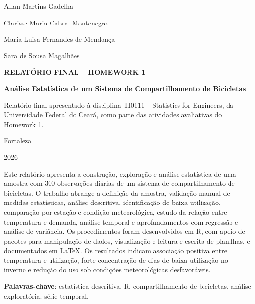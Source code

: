 \documentclass[12pt,oneside,a4paper,english,brazil]{abntex2}
\begin{document}
\begin{folhaderosto}
\begin{center}
{\large Allan Martins Gadelha\par}
{\large Clarisse Maria Cabral Montenegro\par}
{\large Maria Luisa Fernandes de Mendonça\par}
{\large Sara de Sousa Magalhães\par}

\vfill
{\Large\bfseries RELATÓRIO FINAL -- HOMEWORK 1\par}
\vspace{0.35cm}
{\large\bfseries Análise Estatística de um Sistema de Compartilhamento de Bicicletas\par}

\vfill
\hspace{0.45\textwidth}
\begin{minipage}{0.50\textwidth}
\SingleSpacing
Relatório final apresentado à disciplina TI0111 -- Statistics for Engineers, da Universidade Federal do Ceará, como parte das atividades avaliativas do Homework 1.
\end{minipage}

\vfill
{\large Fortaleza\par}
{\large 2026\par}
\end{center}
\end{folhaderosto}

\begin{resumo}
Este relatório apresenta a construção, exploração e análise estatística de uma amostra com 300 observações diárias de um sistema de compartilhamento de bicicletas. O trabalho abrange a definição da amostra, validação manual de medidas estatísticas, análise descritiva, identificação de baixa utilização, comparação por estação e condição meteorológica, estudo da relação entre temperatura e demanda, análise temporal e aprofundamentos com regressão e análise de variância. Os procedimentos foram desenvolvidos em R, com apoio de pacotes para manipulação de dados, visualização e leitura e escrita de planilhas, e documentados em LaTeX. Os resultados indicam associação positiva entre temperatura e utilização, forte concentração de dias de baixa utilização no inverno e redução do uso sob condições meteorológicas desfavoráveis.

\vspace{\onelineskip}
\noindent\textbf{Palavras-chave}: estatística descritiva. R. compartilhamento de bicicletas. análise exploratória. série temporal.
\end{resumo}
\end{document}
